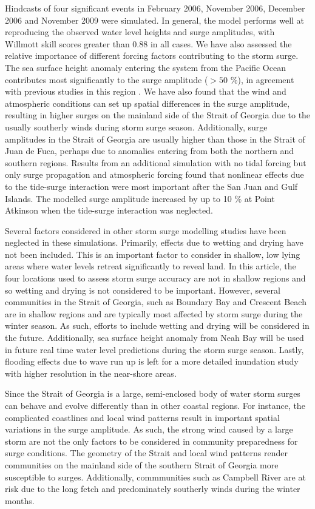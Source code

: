 \documentclass[pdftex,10pt]{article}
\begin{document}
Hindcasts of four significant events in February 2006, November 2006, December 2006 and November 2009 were simulated. In general, the model performs well at reproducing the observed water level heights and surge amplitudes, with Willmott skill scores greater than 0.88 in all cases. We have also assessed the relative importance of different forcing factors contributing to the storm surge. The sea surface height anomaly entering the system from the Pacific Ocean contributes most significantly to the surge amplitude ($>50$ \%), in agreement with previous studies in this region \citep{murty1995storm}. We have also found that the wind and atmospheric conditions can set up spatial differences in the surge amplitude, resulting in higher surges on the mainland side of the Strait of Georgia due to the usually southerly winds during storm surge season. Additionally, surge amplitudes in the Strait of Georgia are usually higher than those in the Strait of Juan de Fuca, perhaps due to anomalies entering from both the northern and southern regions. Results from an additional simulation with no tidal forcing but only surge propagation and atmospheric forcing found that nonlinear effects due to the tide-surge interaction were most important after the San Juan and Gulf Islands. The modelled surge amplitude increased by up to 10 \% at Point Atkinson when the tide-surge interaction was neglected. 

Several factors considered in other storm surge modelling studies have been neglected in these simulations. Primarily, effects due to wetting and drying have not been included. This is an important factor to consider in shallow, low lying areas where water levels retreat significantly to reveal land. In this article, the four locations used to assess storm surge accuracy are not in shallow regions and so wetting and drying is not considered to be important. However, several communities in the Strait of Georgia, such as Boundary Bay and Crescent Beach are in shallow regions and are typically most affected by storm surge during the winter season. As such, efforts to include wetting and drying will be considered in the future. Additionally, sea surface height anomaly from Neah Bay will be used in future real time water level predictions during the storm surge season. Lastly, flooding effects due to wave run up is left for a more detailed inundation study with higher resolution in the near-shore areas. 

Since the Strait of Georgia is a large, semi-enclosed body of water storm surges can behave and evolve differently than in other coastal regions. For instance, the complicated coastlines and local wind patterns result in important spatial variations in the surge amplitude. As such, the strong wind caused by a large storm are not the only factors to be considered in community preparedness for surge conditions. The geometry of the Strait and local wind patterns render communities on the mainland side of the southern Strait of Georgia more susceptible to surges. Additionally, commmunities such as Campbell River are at risk due to the long fetch and predominately southerly winds during the winter months.
\end{document}

